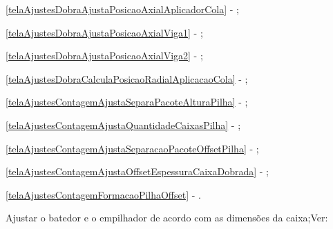\begin{procedureAdjustmentNoRecipe}
\begin{foldCount}
    \item[\ding{\dingNumber}] \ref{telaAjustesDobraAjustaPosicaoAxialAplicadorCola} - ;
    \item[\ding{\dingNumber}] \ref{telaAjustesDobraAjustaPosicaoAxialViga1} - ;
    \item[\ding{\dingNumber}] \ref{telaAjustesDobraAjustaPosicaoAxialViga2} - ;
    \item[\ding{\dingNumber}] \ref{telaAjustesDobraCalculaPosicaoRadialAplicacaoCola} - ;
    \item[\ding{\dingNumber}] \ref{telaAjustesContagemAjustaSeparaPacoteAlturaPilha} - ;
    \item[\ding{\dingNumber}] \ref{telaAjustesContagemAjustaQuantidadeCaixasPilha} - ;
    \item[\ding{\dingNumber}] \ref{telaAjustesContagemAjustaSeparacaoPacoteOffsetPilha} - ;
    \item[\ding{\dingNumber}] \ref{telaAjustesContagemAjustaOffsetEspessuraCaixaDobrada} - ;
    \item[\ding{\dingNumber}] \ref{telaAjustesContagemFormacaoPilhaOffset} - .
    
    
  \end{foldCount}

  \else

  \item[\ding{\dingNumber}] Ajustar o batedor e o empilhador de acordo com as dimensões da caixa;Ver:
  

  \begin{stacker}


\end{stacker}
\end{procedureAdjustmentNoRecipe}
